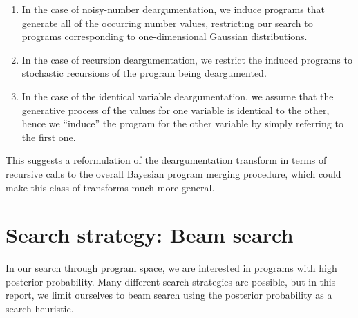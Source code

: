 \documentclass[a4paper,10pt]{article}
\begin{document}
\begin{enumerate}
\item In the case of noisy-number deargumentation, we induce programs that generate all of the occurring number values, restricting our search to programs corresponding to one-dimensional Gaussian distributions.
\item In the case of recursion deargumentation, we restrict the induced programs to stochastic recursions of the program being deargumented.
\item In the case of the identical variable deargumentation, we assume that the generative process of the values for one variable is identical to the other, hence we ``induce'' the program for the other variable by simply referring to the first one.
\end{enumerate}

This suggests a reformulation of the deargumentation transform in terms of recursive calls to the overall Bayesian program merging procedure, which could make this class of transforms much more general.


\newpage
\section{Search strategy: Beam search}

In our search through program space, we are interested in programs with high posterior probability. Many different search strategies are possible, but in this report, we limit ourselves to beam search using the posterior probability as a search heuristic.
\end{document}
